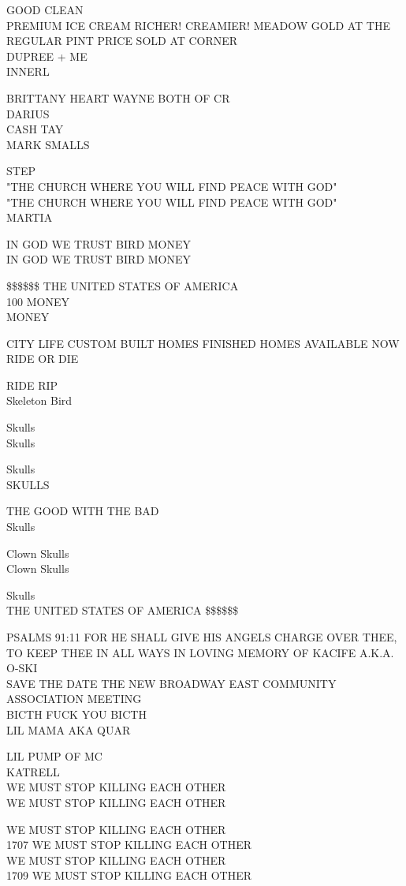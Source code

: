 \documentclass[10pt,letterpaper]{article}
\begin{document}
GOOD CLEAN\\
PREMIUM ICE CREAM RICHER! CREAMIER! MEADOW GOLD AT THE REGULAR PINT PRICE SOLD AT CORNER\\
DUPREE + ME\\
INNERL

BRITTANY HEART WAYNE BOTH OF CR\\
DARIUS\\
CASH TAY\\
MARK SMALLS

STEP\\
"THE CHURCH WHERE YOU WILL FIND PEACE WITH GOD"\\
"THE CHURCH WHERE YOU WILL FIND PEACE WITH GOD"\\
MARTIA

IN GOD WE TRUST BIRD MONEY\\
IN GOD WE TRUST BIRD MONEY

\$\$\$\$\$\$ THE UNITED STATES OF AMERICA\\
100 MONEY\\
MONEY

CITY LIFE CUSTOM BUILT HOMES FINISHED HOMES AVAILABLE NOW\\
RIDE OR DIE

RIDE RIP\\
Skeleton Bird

Skulls\\
Skulls

Skulls\\
SKULLS

THE GOOD WITH THE BAD\\
Skulls

Clown Skulls\\
Clown Skulls

Skulls\\
THE UNITED STATES OF AMERICA \$\$\$\$\$\$

PSALMS 91:11 FOR HE SHALL GIVE HIS ANGELS CHARGE OVER THEE, TO KEEP THEE IN ALL WAYS IN LOVING MEMORY OF KACIFE A.K.A. O{-}SKI\\
SAVE THE DATE THE NEW BROADWAY EAST COMMUNITY ASSOCIATION MEETING\\
BICTH FUCK YOU BICTH\\
LIL MAMA AKA QUAR

LIL PUMP OF MC\\
KATRELL\\
WE MUST STOP KILLING EACH OTHER\\
WE MUST STOP KILLING EACH OTHER

WE MUST STOP KILLING EACH OTHER\\
1707 WE MUST STOP KILLING EACH OTHER\\
WE MUST STOP KILLING EACH OTHER\\
1709 WE MUST STOP KILLING EACH OTHER
\end{document}
